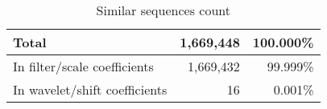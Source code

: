 \begin{table}[H]
\caption{Similar sequences count}\label{table:sequence_counts}
\centering
\begin{tabular}{lrr}
\hline
	Total & 1,669,448 & 100.000\% \\
	\hline
	In filter/scale coefficients & 1,669,432 & 99.999\% \\
	In wavelet/shift coefficients & 16 & 0.001\% \\
\hline
\end{tabular}
\end{table}
